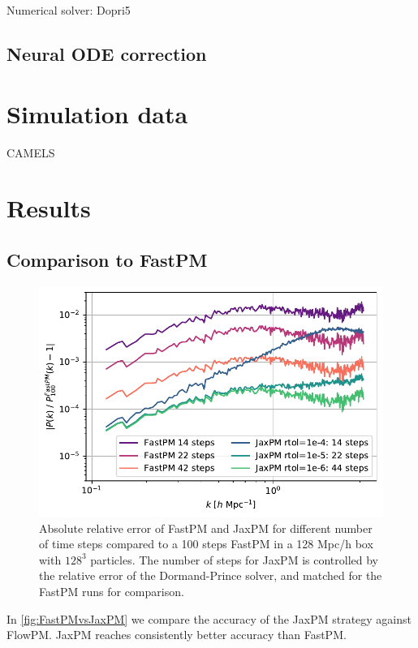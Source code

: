 \documentclass[fleqn,usenatbib]{mnras}
\newcommand{\nblink}[1]{\href{https://github.com/DifferentiableUniverseInitiative/jaxpm-paper/blob/main/notebooks/#1.ipynb}{\faFileCodeO}}
\begin{document}
Numerical solver: Dopri5

\subsection{Neural ODE correction}


\section{Simulation data}

CAMELS


\section{Results}

\subsection{Comparison to FastPM}

\begin{figure}
    \centering
    \includegraphics[width=\columnwidth]{figures/FastPMvsDopri.pdf}
    \caption{Absolute relative error of FastPM and JaxPM for different number of time steps compared to a 100 steps FastPM in a 128 Mpc/h box with $128^3$ particles. The number of steps for JaxPM is controlled by the relative error of the Dormand-Prince solver, and matched for the FastPM runs for comparison. \nblink{FastPMvsDOPRI}}
    \label{fig:FastPMvsJaxPM}
\end{figure}

In \autoref{fig:FastPMvsJaxPM} we compare the accuracy of the JaxPM strategy against FlowPM. JaxPM reaches consistently better accuracy than FastPM.
\end{document}
